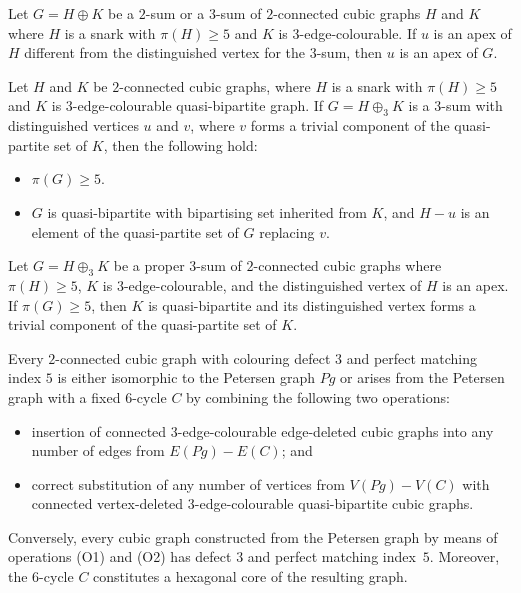 \documentclass[10pt,a4paper]{amsart}
\begin{document}
\begin{lemma}\label{lem:pmi4sum3gen}
Let $G=H\oplus K$ be a $2$-sum or a $3$-sum of $2$-connected
cubic graphs $H$ and $K$ where $H$ is a snark with $\pi(H)\ge
5$ and $K$ is $3$-edge-colourable. If $u$ is an apex of $H$
different from the distinguished vertex for the $3$-sum, then
$u$ is an apex of $G$.
\end{lemma}

\begin{theorem}\label{thm:3-sumpmi5}
Let $H$ and $K$ be $2$-connected cubic graphs, where $H$ is a
snark with $\pi(H)\ge 5$ and $K$ is $3$-edge-colourable
quasi-bipartite graph. If $G=H\oplus_3 K$ is a $3$-sum with
distinguished vertices $u$ and $v$, where
$v$ forms a trivial component of the quasi-partite set of $K$,
then the following hold:
\begin{itemize}
\item[{\rm (i)}] $\pi(G)\ge 5$.

\item[{\rm (ii)}] $G$ is quasi-bipartite with bipartising
    set inherited from $K$, and $H-u$ is an element of the
    quasi-partite set of $G$ replacing $v$.
\end{itemize}
\end{theorem}

\begin{theorem}\label{thm:3-sumpmi5-converse}
Let $G=H\oplus_3 K$ be a proper $3$-sum of $2$-connected cubic
graphs where $\pi(H)\ge 5$, $K$ is $3$-edge-colourable, and the
distinguished vertex of $H$ is an apex. If $\pi(G)\ge 5$, then
$K$ is quasi-bipartite and its distinguished vertex forms a
trivial component of the quasi-partite set of $K$.
\end{theorem}

\begin{theorem}\label{thm:main}
Every $2$-connected cubic graph with colouring defect $3$ and
perfect matching index $5$ is either isomorphic to the Petersen
graph $Pg$ or arises from the Petersen graph with a fixed
$6$-cycle $C$ by combining the following two operations:
\begin{itemize}
\item[{\rm (O1)}] insertion of connected
    $3$-edge-colourable edge-deleted cubic graphs into any
    number of edges from $E(Pg)-E(C)$; and
\item[{\rm (O2)}] correct substitution of any number of
    vertices from $V(Pg)-V(C)$ with connected
    vertex-deleted $3$-edge-colourable quasi-bipartite
    cubic graphs.
\end{itemize}
Conversely, every cubic graph constructed from the Petersen
graph by means of operations {\rm (O1)} and {\rm (O2)} has
defect $3$ and perfect matching index~$5$. Moreover, the
$6$-cycle $C$ constitutes a hexagonal core of the resulting
graph.
\end{theorem}
\end{document}
